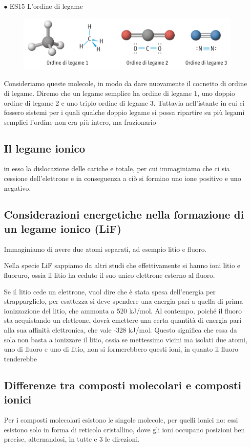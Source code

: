 $\bullet$ ES15 L'ordine di legame
\begin{figure}[htp]
    \centering
    \includegraphics[width=14cm]{immagini/ordine-di-legame.png}
\end{figure}
Consideriamo queste molecole, in modo da dare nuovamente il cocnetto di ordine di legame. Diremo che un legame semplice ha ordine di legame 1, uno doppio ordine di legame 2 e uno triplo ordine di legame 3. Tuttavia nell'istante in cui ci fossero sistemi per i quali qualche doppio legame si possa ripartire su più legami semplici l'ordine non era più intero, ma frazionario
\subsection{Il legame ionico}
in esso la dislocazione delle cariche e totale, per cui immaginiamo che ci sia cessione dell'elettrone e in conseguenza a ciò si formino uno ione positivo e uno negativo.

\subsection{Considerazioni energetiche nella formazione di un legame ionico (LiF)}
Immaginiamo di avere due atomi separati, ad esempio litio e fluoro.

Nella specie LiF sappiamo da altri studi che effettivamente si hanno ioni litio e fluoruro, ossia il litio ha ceduto il suo unico elettrone esterno al fluoro.

Se il litio cede un elettrone, vuol dire che è stata spesa dell'energia per strapparglielo, per esattezza si deve spendere una energia pari a quella di prima ionizzazione del litio, che ammonta a 520 kJ/mol.
Al contempo, poiché il fluoro sta acquistando un elettrone, dovrà emettere una certa quantità di energia pari alla sua affinità elettronica, che vale -328 kJ/mol. Questo significa che essa da sola non basta a ionizzare il litio, ossia se mettessimo vicini ma isolati due atomi, uno di fluoro e uno di litio, non si formerebbero questi ioni, in quanto il fluoro tenderebbe
\subsection{Differenze tra composti molecolari e composti ionici}
Per i composti molecolari esistono le singole molecole, per quelli ionici no: essi esistono solo in forma di reticolo cristallino, dove gli ioni occupano posizioni ben precise, alternandosi, in tutte e 3 le direzioni.

